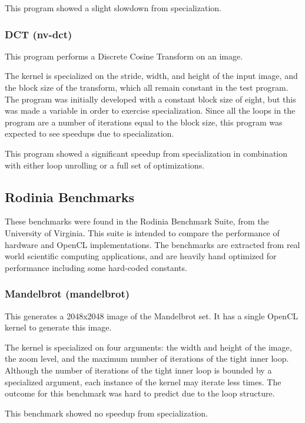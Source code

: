 \documentclass{acm_proc_article-sp}
\begin{document}
This program showed a slight slowdown from specialization.

\subsubsection{DCT (nv-dct)}

This program performs a Discrete Cosine Transform on an image.

The kernel is specialized on the stride, width, and height of the input image,
and the block size of the transform, which all remain constant in the test
program. The program was initially developed with a constant block size of
eight, but this was made a variable in order to exercise specialization. Since
all the loops in the program are a number of iterations equal to the block size,
this program was expected to see speedups due to specialization.

This program showed a significant speedup from specialization in combination
with either loop unrolling or a full set of optimizations.

\subsection{Rodinia Benchmarks}

These benchmarks were found in the Rodinia Benchmark
Suite\cite{Rodinia:Benchmarks}, from the University of Virginia. This suite is
intended to compare the performance of hardware and OpenCL implementations.
The benchmarks are extracted from real world scientific computing applications,
and are heavily hand optimized for performance including some hard-coded
constants.

\subsubsection{Mandelbrot (mandelbrot)}

This generates a 2048x2048 image of the Mandelbrot set. It has a single OpenCL
kernel to generate this image.

The kernel is specialized on four arguments: the width and height of the image,
the zoom level, and the maximum number of iterations of the tight inner loop.
Although the number of iterations of the tight inner loop is bounded by a
specialized argument, each instance of the kernel may iterate less times.  The
outcome for this benchmark was hard to predict due to the loop structure.

This benchmark showed no speedup from specialization.
\end{document}

